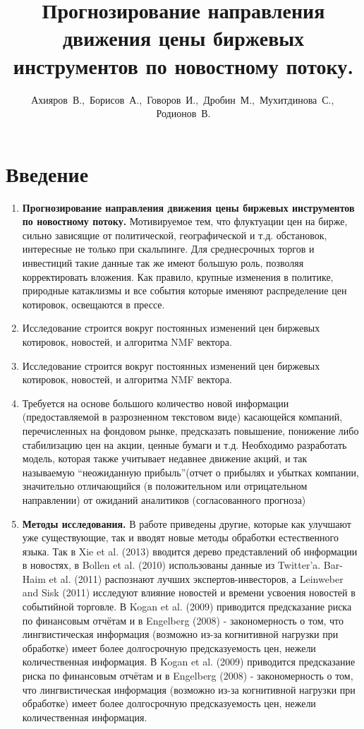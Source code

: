 \documentclass[12pt, twoside]{article}
\title
    [Прогнозирование направления движения цены биржевых инструментов по новостному потоку ] %
    {Прогнозирование направления движения цены биржевых инструментов по новостному потоку.}
\author
    {Ахияров~В.,\, Борисов~А.,\, Говоров~И.,\, Дробин~М.,\, Мухитдинова~С.,\, Родионов~В. } %
\begin{document}
\maketitle

\section{Введение}

\begin{enumerate}
\item \textbf{Прогнозирование направления движения цены биржевых инструментов по новостному потоку.}
Мотивируемое тем, что флуктуации цен на бирже, сильно зависящие от политической, географической и т.д. обстановок,  интересные не только при скальпинге. Для среднесрочных торгов и инвестиций такие данные так же имеют большую роль, позволяя корректировать вложения. Как правило, крупные изменения в политике, природные катаклизмы и все события которые именяют распределение цен котировок, освещаются в прессе. 

\item Исследование строится вокруг постоянных изменений цен биржевых котировок, новостей, и алгоритма NMF вектора.
\item Исследование строится вокруг постоянных изменений цен биржевых котировок, новостей, и алгоритма NMF вектора.

\item Требуется на основе большого количество новой информации (предоставляемой в разрозненном текстовом виде)  касающейся компаний, перечисленных на фондовом рынке, предсказать повышение, понижение либо стабилизацию цен на акции, ценные бумаги и т.д. Необходимо разработать модель, которая также учитывает недавнее движение акций, и так называемую “неожиданную прибыль”(отчет о прибылях и убытках компании, значительно отличающийся (в положительном или отрицательном направлении) от ожиданий аналитиков (согласованного прогноза)

\item \textbf{Методы исследования.}
В работе приведены другие, которые как улучшают уже существующие, так и вводят новые методы обработки естественного языка.
Так в Xie et al. (2013) вводится дерево представлений об информации в новостях, в Bollen et al. (2010) использованы данные из Twitter'a.
Bar-Haim et al. (2011) распознают лучших экспертов-инвесторов, а Leinweber and Sisk (2011) исследуют влияние новостей и времени усвоения новостей в событийной торговле.
В Kogan et al. (2009) приводится предсказание риска по финансовым отчётам и в Engelberg (2008) - закономерность о том, что лингвистическая информация (возможно из-за когнитивной нагрузки при обработке) имеет более долгосрочную предсказуемость цен, нежели количественная информация.
В Kogan et al. (2009) приводится предсказание риска по финансовым отчётам и в Engelberg (2008) - закономерность о том, что лингвистическая информация (возможно из-за когнитивной нагрузки при обработке) имеет более долгосрочную предсказуемость цен, нежели количественная информация.


\end{enumerate}
\end{document}
